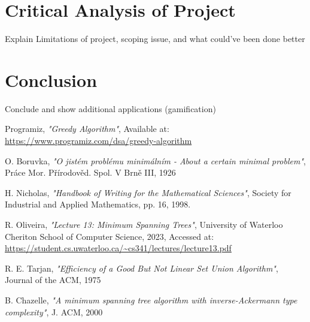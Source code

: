\documentclass[11pt]{article}
\begin{document}
\section{Critical Analysis of Project}
    Explain Limitations of project, scoping issue, and what could've been done better

\section{Conclusion}
    Conclude and show additional applications (gamification)


\pagebreak 

\begin{thebibliography}{30}
     Programiz, \emph{"Greedy Algorithm"}, Available at: \url{https://www.programiz.com/dsa/greedy-algorithm}

     O. Boruvka, \emph{"O jistém problému minimálním - About a certain minimal problem"}, Práce Mor. Přírodověd. Spol. V Brně III, 1926

     H. Nicholas, \emph{"Handbook of Writing for the Mathematical Sciences"}, Society for Industrial and Applied Mathematics, pp. 16, 1998.

     R. Oliveira, \emph{"Lecture 13: Minimum Spanning Trees"}, University of Waterloo Cheriton School of Computer Science, 2023, Accessed at: \url{https://student.cs.uwaterloo.ca/~cs341/lectures/lecture13.pdf}

     R. E. Tarjan, \emph{"Efficiency of a Good But Not Linear Set Union Algorithm"}, Journal of the ACM, 1975
    
     B. Chazelle, \emph{"A minimum spanning tree algorithm with inverse-Ackermann type complexity"}, J. ACM, 2000 

\end{thebibliography}
\end{document}

